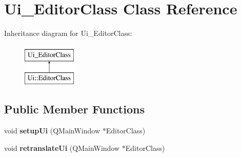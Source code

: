 \hypertarget{class_ui___editor_class}{}\section{Ui\+\_\+\+Editor\+Class Class Reference}
\label{class_ui___editor_class}
Inheritance diagram for Ui\+\_\+\+Editor\+Class\+:\begin{figure}[H]
\begin{center}
\leavevmode
\includegraphics[height=2.000000cm]{class_ui___editor_class}
\end{center}
\end{figure}
\subsection*{Public Member Functions}
\begin{DoxyCompactItemize}
\item 
void {\bfseries setup\+Ui} (Q\+Main\+Window $\ast$Editor\+Class)\hypertarget{class_ui___editor_class_a1d3d516aff0a41572f79794b2bba2b08}{}\label{class_ui___editor_class_a1d3d516aff0a41572f79794b2bba2b08}

\item 
void {\bfseries retranslate\+Ui} (Q\+Main\+Window $\ast$Editor\+Class)\hypertarget{class_ui___editor_class_a19c6f88178e19a9b3b88cac833c9c637}{}\label{class_ui___editor_class_a19c6f88178e19a9b3b88cac833c9c637}

\end{DoxyCompactItemize}
